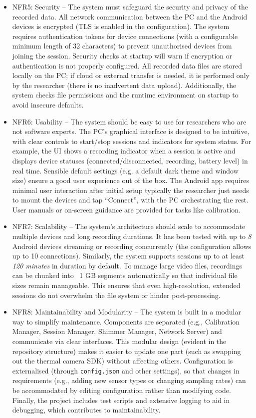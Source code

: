 \begin{itemize}
    \item NFR5: Security -- The system must safeguard the security and privacy of the recorded data. All network communication between the PC and the Android devices is encrypted (TLS is enabled in the configuration). The system requires authentication tokens for device connections (with a configurable minimum length of 32 characters) to prevent unauthorised devices from joining the session. Security checks at startup will warn if encryption or authentication is not properly configured. All recorded data files are stored locally on the PC; if cloud or external transfer is needed, it is performed only by the researcher (there is no inadvertent data upload). Additionally, the system checks file permissions and the runtime environment on startup to avoid insecure defaults.

    \item NFR6: Usability -- The system should be easy to use for researchers who are not software experts. The PC's graphical interface is designed to be intuitive, with clear controls to start/stop sessions and indicators for system status. For example, the UI shows a recording indicator when a session is active and displays device statuses (connected/disconnected, recording, battery level) in real time. Sensible default settings (e.g. a default dark theme and window size) ensure a good user experience out of the box. The Android app requires minimal user interaction after initial setup \textemdash typically the researcher just needs to mount the devices and tap ``Connect'', with the PC orchestrating the rest. User manuals or on-screen guidance are provided for tasks like calibration.

    \item NFR7: Scalability -- The system's architecture should scale to accommodate multiple devices and long recording durations. It has been tested with up to \emph{8} Android devices streaming or recording concurrently (the configuration allows up to 10 connections). Similarly, the system supports sessions up to at least \emph{120 minutes} in duration by default. To manage large video files, recordings can be chunked into ~1 GB segments automatically so that individual file sizes remain manageable. This ensures that even high-resolution, extended sessions do not overwhelm the file system or hinder post-processing.

    \item NFR8: Maintainability and Modularity -- The system is built in a modular way to simplify maintenance. Components are separated (e.g., Calibration Manager, Session Manager, Shimmer Manager, Network Server) and communicate via clear interfaces. This modular design (evident in the repository structure) makes it easier to update one part (such as swapping out the thermal camera SDK) without affecting others. Configuration is externalised (through \texttt{config.json} and other settings), so that changes in requirements (e.g., adding new sensor types or changing sampling rates) can be accommodated by editing configuration rather than modifying code. Finally, the project includes test scripts and extensive logging to aid in debugging, which contributes to maintainability.
\end{itemize}

